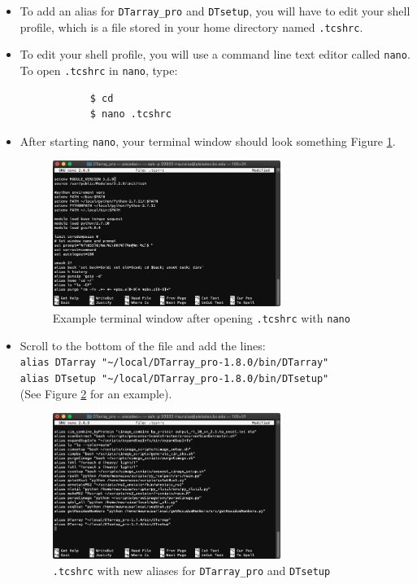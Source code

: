 \documentclass[12pt]{article}
\newcommand{\VERSION}{1.8.0}
\begin{document}
	\begin{itemize}
		\item To add an alias for \texttt{DTarray\_pro} and \texttt{DTsetup}, you will have to edit your shell profile, which is a file stored in your home directory named \texttt{.tcshrc}.
		
		\item To edit your shell profile, you will use a command line text editor called \texttt{nano}. To open \texttt{.tcshrc} in \texttt{nano}, type:
		
		\begin{lstlisting}
			$ cd
			$ nano .tcshrc
		\end{lstlisting}
		
		\item After starting \texttt{nano}, your terminal window should look something Figure \ref{fig:step_1}.
		
		\begin{figure}[h!]
			\centering
			\includegraphics[width=0.7\textwidth]{step_1.png}
			\caption{Example terminal window after opening \texttt{.tcshrc} with \texttt{nano}}
			\label{fig:step_1}
		\end{figure}
		
		\item Scroll to the bottom of the file and add the lines: \\
		\texttt{alias DTarray "\textasciitilde/local/DTarray\_pro-\VERSION/bin/DTarray"} \\
		\texttt{alias DTsetup "\textasciitilde/local/DTarray\_pro-\VERSION/bin/DTsetup"} \\
		(See Figure \ref{fig:step_2} for an example).
		
		\begin{figure}[h!]
			\centering
			\includegraphics[width=0.7\textwidth]{step_2.png}
			\caption{\texttt{.tcshrc} with new aliases for \texttt{DTarray\_pro} and \texttt{DTsetup}}
			\label{fig:step_2}
		\end{figure}
	

\end{itemize}
\end{document}
